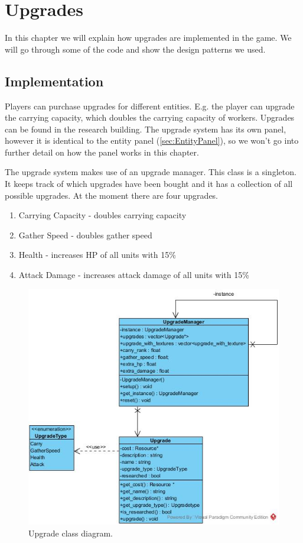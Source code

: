 \section{Upgrades} 
In this chapter we will explain how upgrades are implemented in the game. We 
will go through some of the code and show the design patterns we used.

\subsection{Implementation} 
\label{Upgrades} 
Players can purchase upgrades for different entities. E.g. the player can 
upgrade the carrying capacity, which doubles the carrying capacity of workers. 
Upgrades can be found in the research building. The upgrade system has its own 
panel, however it is identical to the entity panel (\cref{sec:EntityPanel}), 
so we won't go into further detail on how the panel works in this chapter. 

The upgrade system makes use of an upgrade manager. This class is a singleton.
It keeps track of which upgrades have been bought and it has a collection of
all possible upgrades. At the moment there are four upgrades.

\begin{enumerate} 
    \item Carrying Capacity - doubles carrying capacity 
    \item Gather Speed - doubles gather speed 
    \item Health - increases HP of all units with 15\% 
    \item Attack Damage - increases attack damage of all units with 15\% 
\end{enumerate}

\begin{figure}[H] 
    \centering 
    \includegraphics[scale=0.75]{res/upgrades.jpg}
    \caption{Upgrade class diagram.}\label{fig:upgrade-figure} 
\end{figure}

